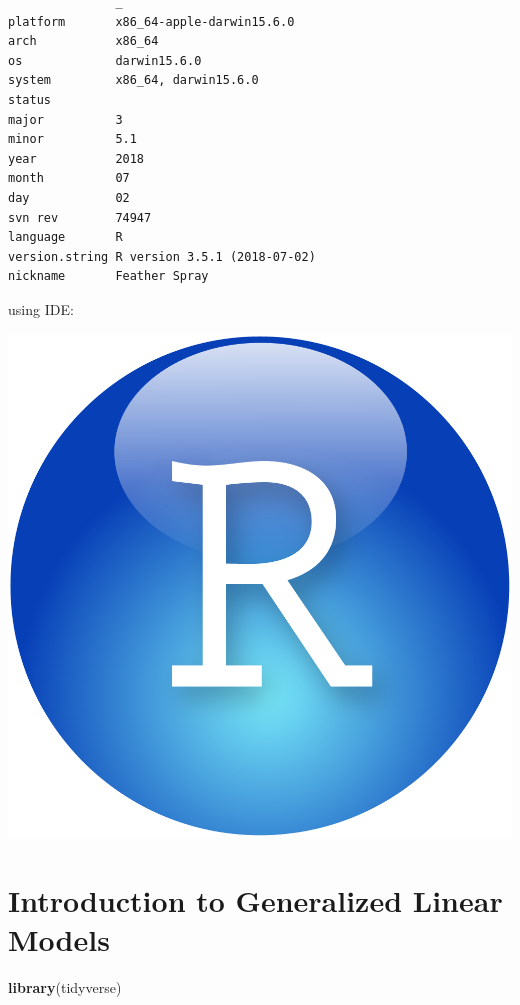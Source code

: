\documentclass[]{book}
\newenvironment{Shaded}{\begin{snugshade}}{\end{snugshade}}
\newcommand{\KeywordTok}[1]{\textcolor[rgb]{0.13,0.29,0.53}{\textbf{#1}}}
\newcommand{\NormalTok}[1]{#1}
\begin{document}
\begin{verbatim}
               _                           
platform       x86_64-apple-darwin15.6.0   
arch           x86_64                      
os             darwin15.6.0                
system         x86_64, darwin15.6.0        
status                                     
major          3                           
minor          5.1                         
year           2018                        
month          07                          
day            02                          
svn rev        74947                       
language       R                           
version.string R version 3.5.1 (2018-07-02)
nickname       Feather Spray               
\end{verbatim}

using IDE:

\begin{center}\includegraphics[width=0.7\linewidth]{rstudioicon} \end{center}

\hypertarget{introduction-to-generalized-linear-models}{%
\chapter{Introduction to Generalized Linear Models}\label{introduction-to-generalized-linear-models}}

\begin{Shaded}
\begin{Highlighting}[]
\KeywordTok{library}\NormalTok{(tidyverse)}
\end{Highlighting}
\end{Shaded}
\end{document}
